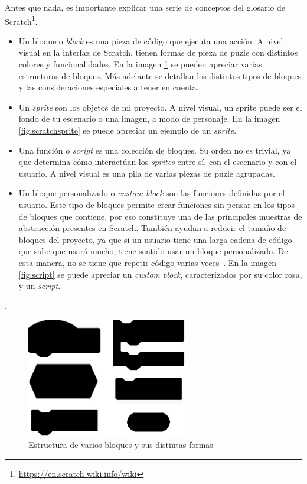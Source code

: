 \documentclass[a4paper, 12pt]{book}
\begin{document}
Antes que nada, es importante explicar una serie de conceptos del glosario de Scratch\footnote{\url{https://en.scratch-wiki.info/wiki}}. 


\begin{itemize}
 \item Un bloque o \textit{block} es una pieza de código que ejecuta una acción. A nivel visual en la interfaz de Scratch, tienen formas de pieza de puzle con distintos colores y funcionalidades. En la imagen \ref{fig:blocks} se pueden apreciar varias estructuras de bloques. Más adelante se detallan los distintos tipos de bloques y las consideraciones especiales a tener en cuenta. 
 \item Un \textit{sprite} son los objetos de mi proyecto. A nivel visual, un sprite puede ser el fondo de tu escenario o una imagen, a modo de personaje. En la imagen \ref{fig:scratchsprite} se puede apreciar un ejemplo de un \textit{sprite}.
 \item Una función o \textit{script} es una colección de bloques. Su orden no es trivial, ya que determina cómo interactúan los \textit{sprites} entre sí, con el escenario y con el usuario. A nivel visual es una pila de varias piezas de puzle agrupadas.
 \item Un bloque personalizado o \textit{custom block} son las funciones definidas por el usuario. Este tipo de bloques permite crear funciones sin pensar en los tipos de bloques que contiene, por eso constituye una de las principales muestras de abstracción presentes en Scratch. También ayudan a reducir el tamaño de bloques del proyecto, ya que si un usuario tiene una larga cadena de código que sabe que usará mucho, tiene sentido usar un bloque personalizado. De esta manera, no se tiene que repetir código varias veces~\cite{scratchWeb}. En la imagen \ref{fig:script} se puede apreciar un \textit{custom block}, caracterizados por su color rosa, y un \textit{script}.
\end{itemize}.

\begin{figure}[htb!]
	\centering
    \includegraphics[width=7cm, keepaspectratio]{img/blocks.jpg}
    \caption{Estructura de varios bloques y sus distintas formas}
    \label{fig:blocks}
\end{figure} 
\end{document}

